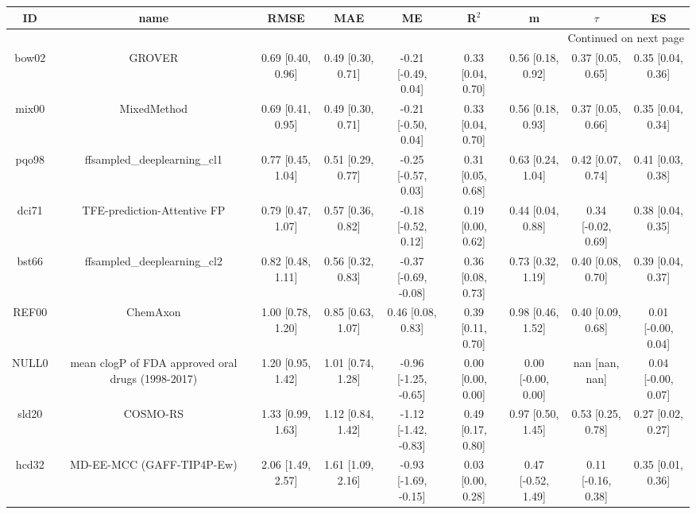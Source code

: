 \documentclass{article}
\begin{document}
\begin{center}
\scriptsize
\begin{longtable}{|ccccccccc|}
\toprule
    ID &                                               name &               RMSE &                MAE &                    ME &              R$^2$ &                   m &              $\tau$ &                  ES \\
\midrule
\endhead
\midrule
\multicolumn{9}{r}{{Continued on next page}} \\
\midrule
\endfoot

\bottomrule
\endlastfoot
 bow02 &                                             GROVER &  0.69 [0.40, 0.96] &  0.49 [0.30, 0.71] &   -0.21 [-0.49, 0.04] &  0.33 [0.04, 0.70] &   0.56 [0.18, 0.92] &   0.37 [0.05, 0.65] &   0.35 [0.04, 0.36] \\
 mix00 &                                        MixedMethod &  0.69 [0.41, 0.95] &  0.49 [0.30, 0.71] &   -0.21 [-0.50, 0.04] &  0.33 [0.04, 0.70] &   0.56 [0.18, 0.93] &   0.37 [0.05, 0.66] &   0.35 [0.04, 0.34] \\
 pqo98 &                       ffsampled\_deeplearning\_cl1 &  0.77 [0.45, 1.04] &  0.51 [0.29, 0.77] &   -0.25 [-0.57, 0.03] &  0.31 [0.05, 0.68] &   0.63 [0.24, 1.04] &   0.42 [0.07, 0.74] &   0.41 [0.03, 0.38] \\
 dci71 &                        TFE-prediction-Attentive FP &  0.79 [0.47, 1.07] &  0.57 [0.36, 0.82] &   -0.18 [-0.52, 0.12] &  0.19 [0.00, 0.62] &   0.44 [0.04, 0.88] &  0.34 [-0.02, 0.69] &   0.38 [0.04, 0.35] \\
 bst66 &                       ffsampled\_deeplearning\_cl2 &  0.82 [0.48, 1.11] &  0.56 [0.32, 0.83] &  -0.37 [-0.69, -0.08] &  0.36 [0.08, 0.73] &   0.73 [0.32, 1.19] &   0.40 [0.08, 0.70] &   0.39 [0.04, 0.37] \\
 REF00 &                                           ChemAxon &  1.00 [0.78, 1.20] &  0.85 [0.63, 1.07] &     0.46 [0.08, 0.83] &  0.39 [0.11, 0.70] &   0.98 [0.46, 1.52] &   0.40 [0.09, 0.68] &  0.01 [-0.00, 0.04] \\
 NULL0 &  mean clogP of FDA approved oral drugs (1998-2017) &  1.20 [0.95, 1.42] &  1.01 [0.74, 1.28] &  -0.96 [-1.25, -0.65] &  0.00 [0.00, 0.00] &  0.00 [-0.00, 0.00] &      nan [nan, nan] &  0.04 [-0.00, 0.07] \\
 sld20 &                                           COSMO-RS &  1.33 [0.99, 1.63] &  1.12 [0.84, 1.42] &  -1.12 [-1.42, -0.83] &  0.49 [0.17, 0.80] &   0.97 [0.50, 1.45] &   0.53 [0.25, 0.78] &   0.27 [0.02, 0.27] \\
 hcd32 &                          MD-EE-MCC (GAFF-TIP4P-Ew) &  2.06 [1.49, 2.57] &  1.61 [1.09, 2.16] &  -0.93 [-1.69, -0.15] &  0.03 [0.00, 0.28] &  0.47 [-0.52, 1.49] &  0.11 [-0.16, 0.38] &   0.35 [0.01, 0.36] \\
\end{longtable}
\end{center}
\end{document}
